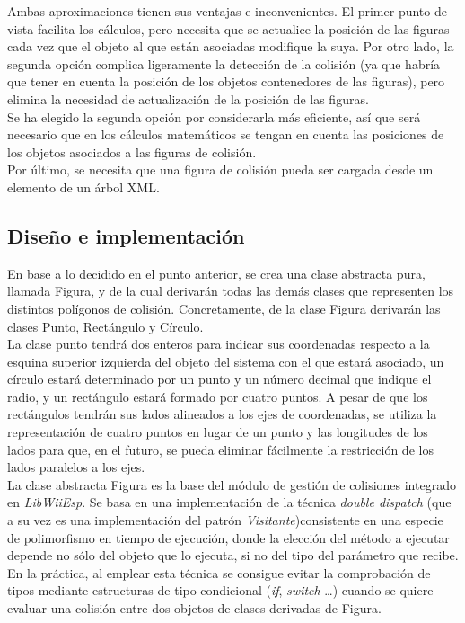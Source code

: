 Ambas aproximaciones tienen sus ventajas e inconvenientes. El primer punto de vista facilita los cálculos, pero necesita que se actualice la posición de las figuras cada vez que el objeto al que están asociadas modifique la suya. Por otro lado, la segunda opción complica ligeramente la detección de la colisión (ya que habría que tener en cuenta la posición de los objetos contenedores de las figuras), pero elimina la necesidad de actualización de la posición de las figuras.\\

Se ha elegido la segunda opción por considerarla más eficiente, así que será necesario que en los cálculos matemáticos se tengan en cuenta las posiciones de los objetos asociados a las figuras de colisión.\\

Por último, se necesita que una figura de colisión pueda ser cargada desde un elemento de un árbol XML.

\subsection{Diseño e implementación}

En base a lo decidido en el punto anterior, se crea una clase abstracta pura, llamada Figura, y de la cual derivarán todas las demás clases que representen los distintos polígonos de colisión. Concretamente, de la clase Figura derivarán las clases Punto, Rectángulo y Círculo.\\

La clase punto tendrá dos enteros para indicar sus coordenadas respecto a la esquina superior izquierda del objeto del sistema con el que estará asociado, un círculo estará determinado por un punto y un número decimal que indique el radio, y un rectángulo estará formado por cuatro puntos. A pesar de que los rectángulos tendrán sus lados alineados a los ejes de coordenadas, se utiliza la representación de cuatro puntos en lugar de un punto y las longitudes de los lados para que, en el futuro, se pueda eliminar fácilmente la restricción de los lados paralelos a los ejes.\\

La clase abstracta Figura es la base del módulo de gestión de colisiones integrado en \emph{LibWiiEsp}. Se basa en una implementación de la técnica \emph{double dispatch} (que a su vez es una implementación del patrón \emph{Visitante})consistente en una especie de polimorfismo en tiempo de ejecución, donde la elección del método a ejecutar depende no sólo del objeto que lo ejecuta, si no del tipo del parámetro que recibe. En la práctica, al emplear esta técnica se consigue evitar la comprobación de tipos mediante estructuras de tipo condicional (\emph{if}, \emph{switch} \ldots) cuando se quiere evaluar una colisión entre dos objetos de clases derivadas de Figura.\\


